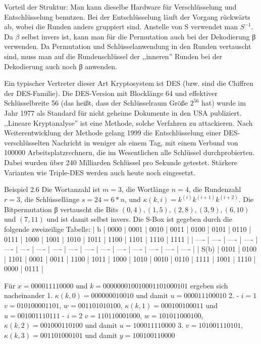 \documentclass[a4paper]{article}
\begin{document}
\begin{multicols}{3}
    Vorteil der Struktur: Man kann dieselbe Hardware für Verschlüsselung und Entschlüsselung benutzen. Bei der Entschlüsselung läuft der Vorgang rückwärts ab, wobei die Runden anders gruppiert sind. Anstelle von S verwendet man $S^{-1}$. Da $β$ selbst invers ist, kann man für die Permutation auch bei der Dekodierung β verwenden. Da Permutation und Schlüsselanwendung in den Runden vertauscht sind, muss man auf die Rundenschlüssel der ,,inneren'' Runden bei der Dekodierung auch noch β anwenden.

    Ein typischer Vertreter dieser Art Kryptosystem ist DES (bzw. sind die Chiffren der DES-Familie). Die DES-Version mit Blocklänge 64 und effektiver Schlüsselbreite 56 (das heißt, dass der Schlüsselraum Größe $2^{56}$ hat) wurde im Jahr 1977 als Standard für nicht geheime Dokumente in den USA publiziert. ,,Lineare Kryptanalyse'' ist eine Methode, solche Verfahren zu attackieren. Nach Weiterentwicklung der Methode gelang 1999 die Entschlüsselung einer DES-verschlüsselten Nachricht in weniger als einem Tag, mit einem Verbund von 100000 Arbeitsplatzrechnern, die im Wesentlichen alle Schlüssel durchprobierten. Dabei wurden über 240 Milliarden Schlüssel pro Sekunde getestet. Stärkere Varianten wie Triple-DES werden auch heute noch eingesetzt.

    Beispiel 2.6 Die Wortanzahl ist $m=3$, die Wortlänge $n=4$, die Rundenzahl $r=3$, die Schlüssellänge $s=24=6*n$, und $\kappa (k,i)=k^{(i)}k^{(i+1)}k^{(i+2)}$. Die Bitpermutation β vertauscht die Bits $(0,4),(1,5),(2,8),(3,9),(6,10)$ und $(7,11)$ und ist damit selbst invers. Die S-Box ist gegeben durch die folgende zweizeilige Tabelle:
    | b    | 0000 | 0001 | 0010 | 0011 | 0100 | 0101 | 0110 | 0111 | 1000 | 1001 | 1010 | 1011 | 1100 | 1101 | 1110 | 1111 |
    | ---- | ---- | ---- | ---- | ---- | ---- | ---- | ---- | ---- | ---- | ---- | ---- | ---- | ---- | ---- | ---- |
    | S(b) | 0101 | 0100 | 1101 | 0001 | 0011 | 1100 | 1011 | 1000 | 1010 | 0010 | 0110 | 1111 | 1001 | 1110 | 0000 | 0111 |

    Für $x= 0000 1111 0000$ und $k=0000 0001 0010 0011 0100 0101$ ergeben sich nacheinander
    1. $\kappa (k,0) = 0000 0001 0010$ und damit $u= 0000 1110 0010$
    2.
    - $i=1$ $v=0101 0000 1101$, $w=0011 0101 0100$, $\kappa (k,1) = 0001 0010 0011$ und $u=0010 0111 0111$
    - $i=2$ $v=1101 1000 1000$, $w=1010 1100 0100$, $\kappa (k,2) = 0010 0011 0100$ und damit $u= 1000 1111 0000$
    3. $v=1010 0111 0101$, $\kappa (k,3) = 0011 0100 0101$ und damit $y=1001 0011 0000$



\end{multicols}
\end{document}
